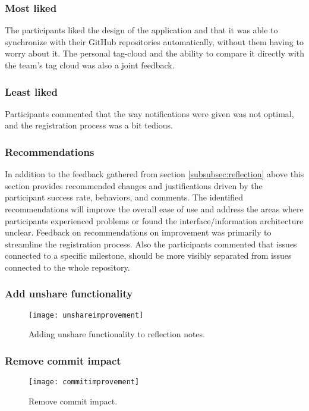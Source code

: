 \subsubsection*{Most liked}
The participants liked the design of the application and that it was able to synchronize with their GitHub repositories automatically, without them having to worry about it. The personal tag-cloud and the ability to compare it directly with the team's tag cloud was also a joint feedback.
\subsubsection*{Least liked}
Participants commented that the way notifications were given was not optimal, and the registration process was a bit tedious.
\subsubsection{Recommendations}
In addition to the feedback gathered from section \ref{subsubsec:reflection} above this section provides recommended changes and justifications driven by the participant success rate, behaviors, and comments. The identified recommendations will improve the overall ease of use and address the areas where participants experienced problems or found the interface/information architecture unclear.
Feedback on recommendations on improvement was primarily to streamline the registration process. Also the participants commented that issues connected to a specific milestone, should be more visibly separated from issues connected to the whole repository. \\

\subsubsection*{Add unshare functionality}
\begin{figure}[h!]
    \centering
        \texttt{[image: unshareimprovement]}
    \caption{Adding unshare functionality to reflection notes.}
    \label{unshareimprovement}
\end{figure}

\subsubsection*{Remove commit impact}
\begin{figure}[h!]
    \centering
        \texttt{[image: commitimprovement]}
    \caption{Remove commit impact.}
    \label{commitimprovement}
\end{figure}

